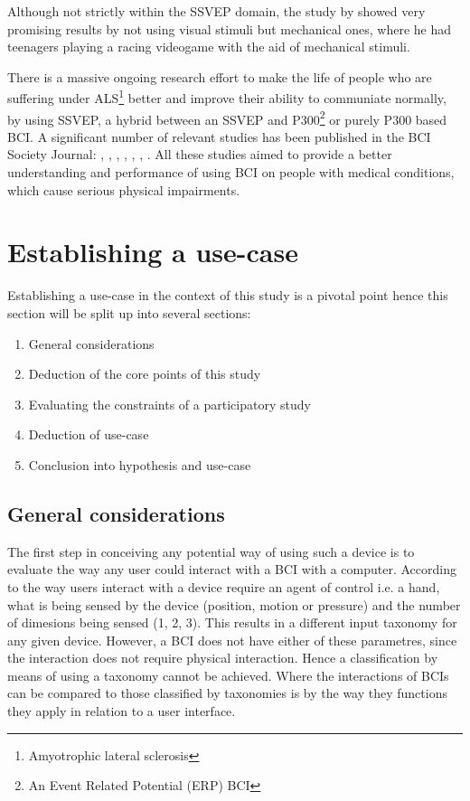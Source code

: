             Although not strictly within the SSVEP domain, the study by \cite{Beveridge.2017} showed very promising results by not using visual stimuli but mechanical ones, where he had teenagers playing a racing videogame with the aid of mechanical stimuli.

            There is a massive ongoing research effort to make the life of people who are suffering under ALS\footnote{Amyotrophic lateral sclerosis} better and improve their ability to communiate normally, by using SSVEP, a hybrid between an SSVEP and P300\footnote{An Event Related Potential (ERP) BCI} or purely P300 based BCI. A significant number of relevant studies has been published in the BCI Society Journal: \cite{Sugata.2016}, \cite{Holz.2015}, \cite{Speier.2017}, \cite{Geronimo.2017}, \cite{Speier.2018}, \cite{Mowla.2017}, \cite{Huggins.2016}. All these studies aimed to provide a better understanding and performance of using BCI on people with medical conditions, which cause serious physical impairments.

        \section{Establishing a use-case}\label{use-case-main}

            Establishing a use-case in the context of this study is a pivotal point hence this section will be split up into several sections: 

            \begin{enumerate}
                \item General considerations
                \item Deduction of the core points of this study
                \item Evaluating the constraints of a participatory study
                \item Deduction of use-case
                \item Conclusion into hypothesis and use-case
            \end{enumerate}

            \subsection{General considerations}

                The first step in conceiving any potential way of using such a device is to evaluate the way any user could interact with a BCI with a computer. According to \cite[4.13]{Buxton.2010} the way users interact with a device require an agent of control i.e. a hand, what is being sensed by the device (position, motion or pressure) and the number of dimesions being sensed (1, 2, 3). This results in a different input taxonomy for any given device. However, a BCI does not have either of these parametres, since the interaction does not require physical interaction. Hence a classification by means of using a taxonomy cannot be achieved. Where the interactions of BCIs can be compared to those classified by taxonomies is by the way they functions they apply in relation to a user interface.

